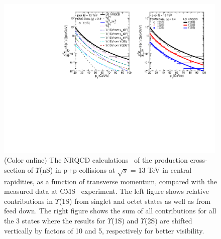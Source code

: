 \begin{figure}
  \centering
  \includegraphics[width=0.99\textwidth]{Figures/Fig3_CMS_YnS_Rap12_13TeV_Pt.pdf}
  \caption{\small{(Color online) The NRQCD calculations~\cite{Kumar:2021sek} of the production cross-section of $\Upsilon$(nS)
      in p+p collisions at $\sqrt{s}$ = 13 TeV in central rapidities, as a function of
      transverse momentum, compared with the measured data at CMS~\cite{CMS:2017dju}
      experiment. The left figure shows relative contributions in $\Upsilon$(1S) from
      singlet and octet states as well as from feed down. The right figure shows the sum
      of all contributions for all the 3 states where the results for $\Upsilon$(1S) and
      $\Upsilon$(2S) are shifted vertically by factors of 10 and 5, respectively
      for better visibility.}}
  \label{Fig:SigmaYnSCMS13TeV}
\end{figure}



